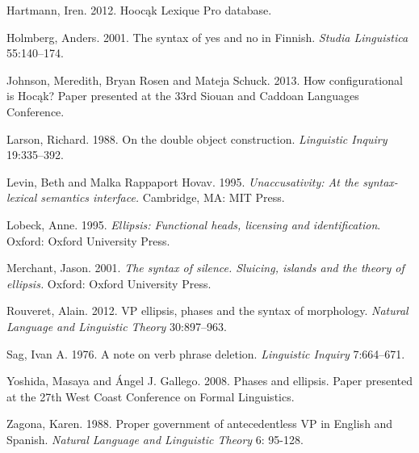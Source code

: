 \documentclass[output=paper]{LSP/langsci}
\begin{document}
\begin{reflist}
Hartmann, Iren. 2012. Hoocąk Lexique Pro database.

Holmberg, Anders. 2001. The syntax of yes and no in Finnish. \emph{Studia Linguistica} 55:140--174.

Johnson, Meredith, Bryan Rosen and Mateja Schuck. 2013. How configurational is Hocąk? Paper presented at the 33rd Siouan and Caddoan Languages Conference.

Larson, Richard. 1988. On the double object construction. \emph{Linguistic Inquiry} 19:335--392.

Levin, Beth and Malka Rappaport Hovav. 1995. \emph{Unaccusativity: At the syntax-lexical semantics interface.} Cambridge, MA: MIT Press.

Lobeck, Anne. 1995. \emph{Ellipsis: Functional heads, licensing and identification}. Oxford: Oxford University Press.

Merchant, Jason. 2001. \emph{The syntax of silence. Sluicing, islands and the theory of ellipsis.} Oxford: Oxford University Press.

Rouveret, Alain. 2012. VP ellipsis, phases and the syntax of morphology. \emph{Natural Language and Linguistic Theory} 30:897--963. 

Sag, Ivan A. 1976. A note on verb phrase deletion. \emph{Linguistic Inquiry} 7:664--671.

Yoshida, Masaya and \'{A}ngel J. Gallego. 2008. Phases and ellipsis. Paper presented at the 27th West Coast Conference on Formal Linguistics.

Zagona, Karen. 1988. Proper government of antecedentless VP in English and Spanish. \emph{Natural Language and Linguistic Theory} 6: 95-128.

\end{reflist}
\end{document}
